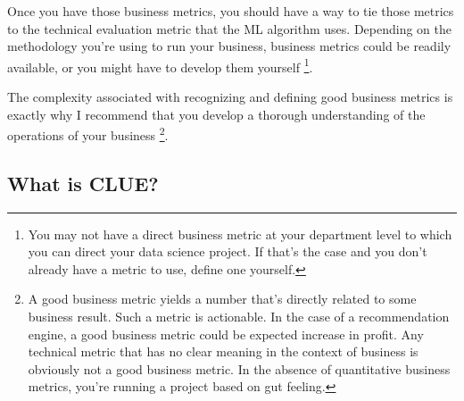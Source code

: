 Once you have those business metrics, you should have a way to
tie those metrics to the technical evaluation metric that the ML
algorithm uses. Depending on the methodology you're using to run
your business, business metrics could be readily available, or
you might have to develop them yourself
\footnote{
    You may not have a direct business metric at your department
    level to which you can direct your data science project. If
    that's the case and you don't already have a metric to use,
    define one yourself.
}.

The complexity associated with recognizing and defining good
business metrics is exactly why I recommend that you develop a
thorough understanding of the operations of your business
\footnote{
    A good business metric yields a number that's directly related
    to some business result. Such a metric is actionable. In the
    case of a recommendation engine, a good business metric could
    be expected increase in profit. Any technical metric that has
    no clear meaning in the context of business is obviously not
    a good business metric. In the absence of quantitative
    business metrics, you're running a project based on gut
    feeling.
}.


\subsection{What is CLUE?}

